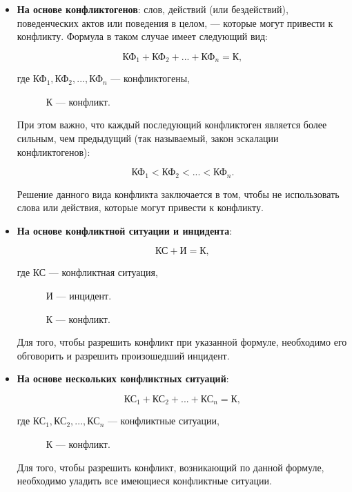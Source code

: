 \begin{itemize}
    \item \textbf{На основе конфликтогенов}: слов, действий (или бездействий),
        поведенческих актов или поведения в целом, --- которые могут привести
        к конфликту. Формула в таком случае имеет следующий вид:
        
        $$ \text{КФ}_1 + \text{КФ}_2 + ... + \text{КФ}_n = \text{К}, $$

      где $\text{КФ}_1, \text{КФ}_2, ..., \text{КФ}_n$ --- конфликтогены,
      
      ~~~~~~$\text{К}$ --- конфликт.

      При этом важно, что каждый последующий конфликтоген является более
      сильным, чем предыдущий (так называемый, закон эскалации
      конфликтогенов):

      $$\text{КФ}_1 < \text{КФ}_2 < ... < \text{КФ}_n.$$

      Решение данного вида конфликта заключается в том, чтобы не
      использовать слова или действия, которые могут привести к конфликту.
  \item \textbf{На основе конфликтной ситуации и инцидента}:

      $$\text{КС} + \text{И} = \text{К},$$

     где $\text{КС}$ --- конфликтная ситуация,

       ~~~~~~$\text{И}$ --- инцидент.

       ~~~~~~$\text{К}$ --- конфликт.

    Для того, чтобы разрешить конфликт при указанной формуле, необходимо
    его обговорить и разрешить произошедший инцидент.
    
\item \textbf{На основе нескольких конфликтных ситуаций}:

        $$ \text{КС}_1 + \text{КС}_2 + ... + \text{КС}_n = \text{К}, $$

      где $\text{КС}_1, \text{КС}_2, ..., \text{КС}_n$ --- конфликтные ситуации,
      
      ~~~~~~$\text{К}$ --- конфликт.

      Для того, чтобы разрешить конфликт, возникающий по данной формуле,
      необходимо уладить все имеющиеся конфликтные ситуации.
\end{itemize}


